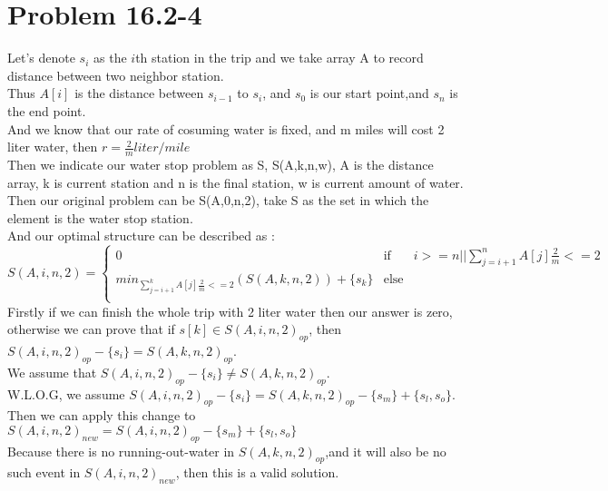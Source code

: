 \documentclass[oneside]{homework} %
\begin{document}
\maketitle
\newpage

\section*{Problem 16.2-4}
Let's denote $s_{i}$ as the $i$th station in the trip and we take array A to record distance between two neighbor station.
\\Thus $A[i]$ is the distance between $s_{i-1}$ to $s_{i}$, and $s_{0}$ is our start point,and $s_{n}$ is the end point.
\\And we know that our rate of cosuming water is fixed, and m miles will cost 2 liter water, then $r = \frac{2}{m} liter/mile $ 
\\ Then we indicate our water stop problem as S, S(A,k,n,w), A is the distance array, k is current station and n is the final station, w is current amount of water. 
\\ Then our original problem can be S(A,0,n,2), take S as the set in which the element is the water stop station.
\\And our optimal structure can be described as : \\ 
\begin{equation}
S(A,i,n,2) = \left\{
             \begin{array}{lcl}
			   {0} &\text{if}& i>=n || \sum_{j=i+1}^{n}A[j]\frac{2}{m}<=2 \\
			   {min_{\sum_{j=i+1}^{k}A[j]\frac{2}{m}<=2}(S(A,k,n,2))+\{s_{k}\}} &\text{else}& \\
             \end{array}  
        \right.
\end {equation}
Firstly if we can finish the whole trip with 2 liter water then our answer is zero, otherwise we can prove that if $s[k] \in S(A,i,n,2)_{op}$, then $S(A,i,n,2)_{op}-\{s_{i}\} = S(A,k,n,2)_{op}$. \\
We assume that $S(A,i,n,2)_{op}-\{s_{i}\} \neq S(A,k,n,2)_{op}$. \\ 
W.L.O.G, we assume $S(A,i,n,2)_{op}-\{s_{i}\} = S(A,k,n,2)_{op} -\{s_{m}\}+\{s_{l},s_{o}\}$.\\
Then we can apply this change to $S(A,i,n,2)_{new} = S(A,i,n,2)_{op}-\{s_{m}\}+\{s_{l},s_{o}\}$\\ 
Because there is no running-out-water in $S(A,k,n,2)_{op}$,and it will also be no such event in $S(A,i,n,2)_{new}$, then this is a valid solution.
\end{document}

